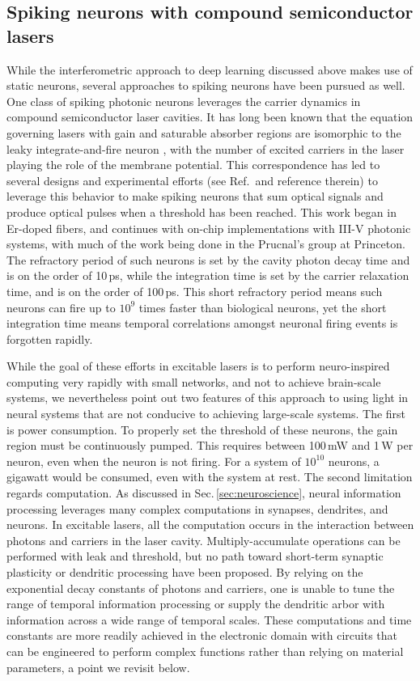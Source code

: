 \documentclass[twocolumn]{article}
\begin{document}
\subsection{Spiking neurons with compound semiconductor lasers}
While the interferometric approach to deep learning discussed above makes use of static neurons, several approaches to spiking neurons have been pursued as well. One class of spiking photonic neurons leverages the carrier dynamics in compound semiconductor laser cavities. It has long been known that the equation governing lasers with gain and saturable absorber regions are isomorphic to the leaky integrate-and-fire neuron \cite{dukr1999}, with the number of excited carriers in the laser playing the role of the membrane potential. This correspondence has led to several designs \cite{nata2013} and experimental efforts (see Ref.\,\cite{prsh2017} and reference therein) to leverage this behavior to make spiking neurons that sum optical signals and produce optical pulses when a threshold has been reached. This work began in Er-doped fibers, and continues with on-chip implementations with III-V photonic systems, with much of the work being done in the Prucnal's group at Princeton. The refractory period of such neurons is set by the cavity photon decay time and is on the order of 10\,ps, while the integration time is set by the carrier relaxation time, and is on the order of 100\,ps. This short refractory period means such neurons can fire up to $10^9$ times faster than biological neurons, yet the short integration time means temporal correlations amongst neuronal firing events is forgotten rapidly. 

While the goal of these efforts in excitable lasers is to perform neuro-inspired computing very rapidly with small networks, and not to achieve brain-scale systems, we nevertheless point out two features of this approach to using light in neural systems that are not conducive to achieving large-scale systems. The first is power consumption. To properly set the threshold of these neurons, the gain region must be continuously pumped. This requires between 100\,mW and 1\,W per neuron, even when the neuron is not firing. For a system of $10^{10}$ neurons, a gigawatt would be consumed, even with the system at rest. The second limitation regards computation. As discussed in Sec.\,\ref{sec:neuroscience}, neural information processing leverages many complex computations in synapses, dendrites, and neurons. In excitable lasers, all the computation occurs in the interaction between photons and carriers in the laser cavity. Multiply-accumulate operations can be performed with leak and threshold, but no path toward short-term synaptic plasticity or dendritic processing have been proposed. By relying on the exponential decay constants of photons and carriers, one is unable to tune the range of temporal information processing or supply the dendritic arbor with information across a wide range of temporal scales. These computations and time constants are more readily achieved in the electronic domain with circuits that can be engineered to perform complex functions rather than relying on material parameters, a point we revisit below.
\end{document}
